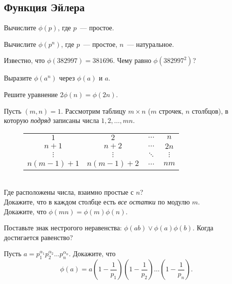 \subsection*{Функция Эйлера}

\begin{problems}

\item
Вычислите $\phi(p)$, где $p$~--- простое.

\item
Вычислите $\phi(p^n)$, где $p$~--- простое, $n$~--- натуральное.

\item
Известно, что
$
    \phi(382997)
=
    381696
$.
Чему равно $\phi(382997^2)$?

\item
Выразите $\phi(a^n)$ через $\phi(a)$ и $a$.

\item
Решите уравнение $2 \phi(n) = \phi(2 n)$.

\item
Пусть $(m, n) = 1$.
Рассмотрим таблицу $m \times n$ ($m$ строчек, $n$ столбцов), в которую
{\it подряд} записаны числа $1, 2, \ldots, mn$.
\begin{figure}[!ht]
\begin{center}
\begin{tabular}{cccc}
$1$             &$2$                &$\ldots$     &$n$\\
$n + 1$         &$n + 2$            &$\ldots$     &$2 n$\\
$\vdots$        &$\vdots$           &$\ddots$     &$\vdots$\\
$n (m - 1) + 1$ &$n (m - 1) + 2$    &$\ldots$     &$nm$
\end{tabular}
\end{center}
\end{figure}
\\
\sbp Где расположены числа, взаимно простые с $n$?
\\
\sbp Докажите, что в каждом столбце есть {\it все остатки} по модулю $m$.
\\
\sbp Докажите, что $\phi(m n) = \phi(m) \phi(n)$.

\item
Поставьте знак нестрогого неравенства: $\phi(a b) \vee \phi(a) \phi(b)$.
Когда достигается равенство?

\item
Пусть $a = p_1^{\alpha_1} p_2^{\alpha_2} \ldots p_n^{\alpha_n}$.
Докажите, что
\[
    \phi(a)
    =
    a
    \left(
        1 - \frac{1}{p_1}
    \right)
    \left(
        1 - \frac{1}{p_2}
    \right)
    \ldots
    \left(
        1 - \frac{1}{p_n}
    \right)
.\]


\end{problems}
